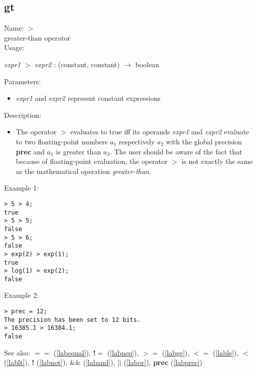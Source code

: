 \subsection{gt}
\label{labgt}
\noindent Name: \textbf{$>$}\\
greater-than operator\\
\noindent Usage: 
\begin{center}
\emph{expr1} \textbf{$>$} \emph{expr2} : (\textsf{constant}, \textsf{constant}) $\rightarrow$ \textsf{boolean}
\end{center}
Parameters: 
\begin{itemize}
\item \emph{expr1} and \emph{expr2} represent constant expressions
\end{itemize}
\noindent Description: \begin{itemize}

\item The operator \textbf{$>$} evaluates to true iff its operands \emph{expr1} and
   \emph{expr2} evaluate to two floating-point numbers $a_1$
   respectively $a_2$ with the global precision \textbf{prec} and
   $a_1$ is greater than $a_2$. The user should
   be aware of the fact that because of floating-point evaluation, the
   operator \textbf{$>$} is not exactly the same as the mathematical
   operation \emph{greater-than}.
\end{itemize}
\noindent Example 1: 
\begin{center}\begin{minipage}{15cm}\begin{Verbatim}[frame=single]
> 5 > 4;
true
> 5 > 5;
false
> 5 > 6;
false
> exp(2) > exp(1);
true
> log(1) > exp(2);
false
\end{Verbatim}
\end{minipage}\end{center}
\noindent Example 2: 
\begin{center}\begin{minipage}{15cm}\begin{Verbatim}[frame=single]
> prec = 12;
The precision has been set to 12 bits.
> 16385.1 > 16384.1;
false
\end{Verbatim}
\end{minipage}\end{center}
See also: \textbf{$==$} (\ref{labequal}), \textbf{!$=$} (\ref{labneq}), \textbf{$>=$} (\ref{labge}), \textbf{$<=$} (\ref{lable}), \textbf{$<$} (\ref{lablt}), \textbf{!} (\ref{labnot}), \textbf{$\&\&$} (\ref{laband}), \textbf{$||$} (\ref{labor}), \textbf{prec} (\ref{labprec})
